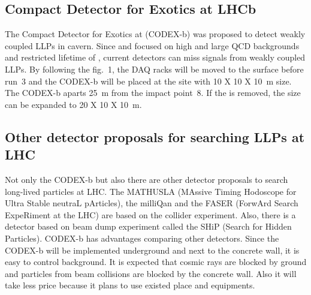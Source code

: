 \subsection{Compact Detector for Exotics at LHCb}

The Compact Detector for Exotics at \lhcb (CODEX-b) was proposed to detect weakly coupled LLPs in \lhcb cavern. 
Since \atlas and \cms focused on high \pt and large QCD backgrounds and restricted lifetime of \lhcb, current detectors can miss signals from weakly coupled LLPs. 
By following the fig.~1, the DAQ racks will be moved to the surface before run~3 and the CODEX-b will be placed at the site with 10 X 10 X 10~m size. 
The CODEX-b aparts 25~m from the impact point~8. 
If the \delphi is removed, the size can be expanded to 20 X 10 X 10~m.


\subsection{Other detector proposals for searching LLPs at LHC}

Not only the CODEX-b but also there are other detector proposals to search long-lived particles at LHC.
The MATHUSLA (MAssive Timing Hodoscope for Ultra Stable neutraL pArticles), the milliQan and the FASER (ForwArd Search ExpeRiment at the LHC) are based on the collider experiment. 
Also, there is a detector based on beam dump experiment called the SHiP (Search for Hidden Particles).
CODEX-b has advantages comparing other detectors.
Since the CODEX-b will be implemented underground and next to the concrete wall, it is easy to control background.
It is expected that cosmic rays are blocked by ground and particles from beam collisions are blocked by the concrete wall.
Also it will take less price because it plans to use existed place and equipments.

